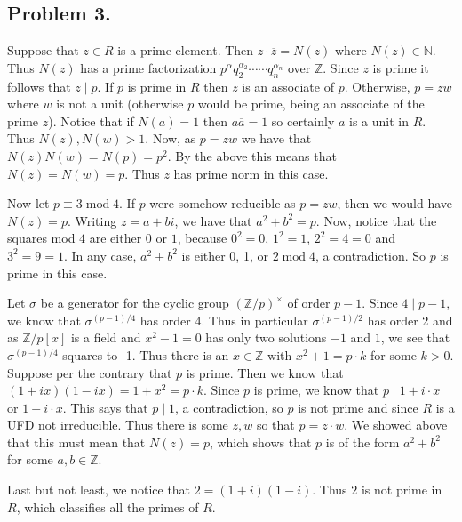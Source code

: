 \documentclass[12pt]{article}
\theoremstyle{definitionstyle}
\def\mbb#1{\mathbb{#1}}
\def\bN{\mbb{N}}
\newcommand{\Z}{\mbb Z}
\renewcommand{\mod}{\mathrm{\;mod\;}}
\begin{document}
    \subsection*{Problem 3.}
    Suppose that $z \in R$ is a prime element. Then $z \cdot \overline z = N(z)$ where $N(z) \in \bN$. Thus $N(z)$ has a prime factorization $p^{\alpha} q_2^{\alpha_2} \cdots \cdots q_n^{\alpha_n}$ over $\Z$. Since $z$ is prime it follows that $z \mid p$. If $p$ is prime in $R$ then $z$ is an associate of $p$. Otherwise, $p = z w$ where $w$ is not a unit (otherwise $p$ would be prime, being an associate of the prime $z$). Notice that if $N(a) = 1$ then $a \overline a = 1$ so certainly $a$ is a unit in $R$. Thus $N(z), N(w) > 1$. Now, as $p = z w$ we have that $N(z) N(w) = N(p) = p^2$. By the above this means that $N(z) = N(w) = p$. Thus $z$ has prime norm in this case.

    Now let $p \equiv 3 \mod 4$. If $p$ were somehow reducible as $p = zw$, then we would have $N(z) = p$. Writing $z = a + bi$, we have that $a^2 + b^2 = p$. Now, notice that the squares mod $4$ are either $0$ or $1$, because $0^2 = 0$, $1^2 = 1$, $2^2 = 4 = 0$ and $3^2 = 9 = 1$. In any case, $a^2+b^2$ is either 0, 1, or $2 \mod 4$, a contradiction. So $p$ is prime in this case.

    Let $\sigma$ be a generator for the cyclic group $(\Z/p)^\times$ of order $p-1$. Since $4 \mid p-1$, we know that $\sigma^{(p-1)/4}$ has order 4. Thus in particular $\sigma^{(p-1)/2}$ has order 2 and as $\Z/p[x]$ is a field and $x^2-1=0$ has only two solutions $-1$ and $1$, we see that $\sigma^{(p-1)/4}$ squares to -1. Thus there is an $x \in \Z$ with $x^2+1=p \cdot k$ for some $k > 0$. Suppose per the contrary that $p$ is prime. Then we know that $(1+ix)(1-ix) = 1+x^2 = p \cdot k$. Since $p$ is prime, we know that $p \mid 1+i \cdot x$ or $1 - i \cdot x$. This says that $p \mid 1$, a contradiction, so $p$ is not prime and since $R$ is a UFD not irreducible. Thus there is some $z, w$ so that $p = z \cdot w$. We showed above that this must mean that $N(z) = p$, which shows that $p$ is of the form $a^2+b^2$ for some $a,b \in \Z$.

    Last but not least, we notice that $2 = (1+i)(1-i)$. Thus $2$ is not prime in $R$, which classifies all the primes of $R$.
\end{document}
